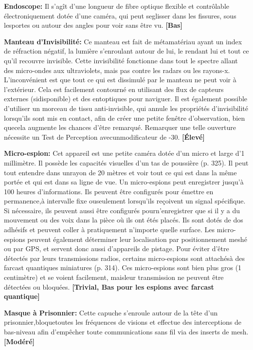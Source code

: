 \textbf{Endoscope:} Il s'agît d'une longueur de fibre optique flexible et contrôlable électroniquement dotée d'une caméra, qui peut seglisser dans les fissures, sous lesportes ou autour des angles pour voir sans être vu. \textbf{[Bas]} 

\textbf{Manteau d'Invisibilité:} Ce manteau est fait de métamatériau ayant un index de réfraction négatif, la lumière s'enroulant autour de lui, le rendant lui et tout ce qu'il recouvre invisible. Cette invisibilité fonctionne dans tout le spectre allant des micro-ondes aux ultraviolets, mais pas contre les radars ou les rayons-x. L'inconvénient est que tout ce qui est dissimulé par le manteau ne peut voir à l'extérieur. Cela est facilement contourné en utilisant des flux de capteurs externes (sidisponible) et des entoptiques pour naviguer. Il est également possible d'utiliser un morceau de tissu anti-invisible, qui annule les propriétés d'invisibilité lorsqu'ils sont mis en contact, afin de créer une petite fenêtre d'observation, bien quecela augmente les chances d'être remarqué. Remarquer une telle ouverture nécessite un Test de Perception avecunmodificateur de -30. \textbf{[Élevé]} 

\textbf{Micro-espion:} Cet appareil est une petite caméra dotée d'un micro et large d'1 millimètre. Il possède les capacités visuelles d'un tas de poussière (p. 325). Il peut tout entendre dans unrayon de 20 mètres et voir tout ce qui est dans la même portée et qui est dans sa ligne de vue. Un micro-espions peut enregistrer jusqu'à 100 heures d'informations. Ils peuvent être configurés pour émettre en permanence,à intervalle fixe ouseulement lorsqu'ils reçoivent un signal spécifique. Si nécessaire, ils peuvent aussi être configurés pourn'enregistrer que si il y a du mouvement ou des voix dans la pièce où ils ont étés placés. Ils sont dotés de dos adhésifs et peuvent coller à pratiquement n'importe quelle surface. Les micro-espions peuvent également déterminer leur localisation par positionnement meshé ou par GPS, et servent donc aussi d'appareils de pistage. Pour éviter d'être détectés par leurs transmissions radios, certains micro-espions sont attachésà des farcast quantiques miniatures (p. 314). Ces micro-espions sont bien plus gros (1 centimètre) et se voient facilement, maisleur transmission ne peuvent être détectées ou bloquées. \textbf{[Trivial, Bas pour les espions avec farcast quantique]} 

\textbf{Masque à Prisonnier: }Cette capuche s'enroule autour de la tête d'un prisonnier,bloquetoutes les fréquences de visions et effectue des interceptions de bas-niveau afin d'empêcher toute communications sans fil via des inserts de mesh. \textbf{[Modéré]} 

